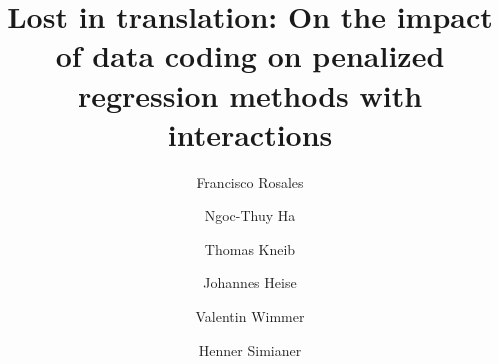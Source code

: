 \documentclass{bmcart}
\newcommand{\0}{\mathbf{0}}
\begin{document}
\begin{frontmatter}

\begin{fmbox}


\title{Lost in translation: On the impact of data coding on penalized regression methods with interactions}


\author[
   addressref={aff1,aff2},                   %
   noteref={n1},                        %
   email={jmartin2@gwdg.de}   %
]{ }
\author[
addressref={aff3},
noteref={n1},
]{Francisco Rosales}
\author[
addressref={aff1},
noteref={n1},
]{Ngoc-Thuy Ha}
\author[
   addressref={aff4},
]{Thomas Kneib}
\author[
addressref={aff5},
]{Johannes Heise}
\author[addressref={aff2}]{Valentin Wimmer}
\author[
addressref={aff1},
]{Henner Simianer}

\address[id=aff1]{%
  , %
}


\end{fmbox}
\end{frontmatter}
\end{document}
